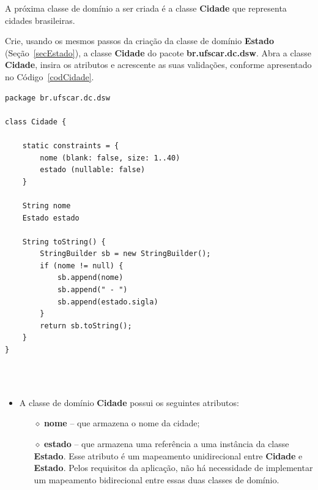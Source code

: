 \vspace{0.5cm}

A próxima classe de domínio a ser  criada é a classe {\bf Cidade} que representa
cidades brasileiras.  

Crie,  usando os  mesmos passos  da criação  da classe  de domínio  {\bf Estado}
(Seção~\ref{secEstado}), a classe {\bf Cidade} do pacote {\bf br.ufscar.dc.dsw}.
Abra a classe {\bf Cidade}, insira os atributos e acrescente as suas validações,
conforme apresentado no Código~\ref{codCidade}.  

\begin{lstlisting}[caption=Classe  de  domínio   {\bf  Cidade},  frame  =  trBL,
    float=htbp, label=codCidade] 
package br.ufscar.dc.dsw

class Cidade {

    static constraints = {
        nome (blank: false, size: 1..40)
        estado (nullable: false)
    }

    String nome
    Estado estado
    
    String toString() {
        StringBuilder sb = new StringBuilder();
        if (nome != null) {
            sb.append(nome)
            sb.append(" - ")
            sb.append(estado.sigla)
        }
        return sb.toString();
    }
}
\end{lstlisting}

\hspace{1cm}\\
\hspace{1cm}\\

\begin{itemize}

\item A classe de domínio {\bf Cidade} possui os seguintes atributos:

\vspace{0.2cm}

\begin{itemize}

\item[$\diamond$] {\bf nome} -- que armazena o nome da cidade;

\vspace{0.2cm}

\item[$\diamond$] {\bf estado} -- que armazena uma referência a uma instância da
  classe {\bf Estado}.   Esse atributo é um mapeamento  unidirecional entre {\bf
    Cidade} e {\bf  Estado}.  Pelos requisitos da aplicação,  não há necessidade
  de implementar um mapeamento bidirecional entre essas duas classes de domínio.

\end{itemize}

\end{itemize}

